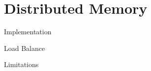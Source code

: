 \section{Distributed Memory}


\begin{frame}
	\begin{block}{Implementation}
	\end{block}
	\begin{block}{Load Balance}
	\end{block}
	\begin{block}{Limitations}
	\end{block}
\end{frame}
